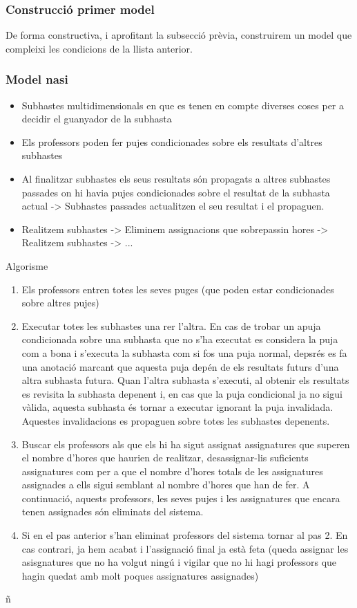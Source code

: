 \documentclass[10pt,twocolumn]{article}
\begin{document}
\subsubsection{Construcció primer model}
De forma constructiva, i aprofitant la subsecció prèvia, construirem un model que compleixi les condicions  de la llista anterior.

\subsubsection{Model nasi}
\begin{itemize}
	\item Subhastes multidimensionals en que es tenen en compte diverses coses per a decidir el guanyador de la subhasta
	\item Els professors poden fer pujes condicionades sobre els resultats d'altres subhastes
	\item Al finalitzar subhastes els seus resultats són propagats a altres subhastes passades on hi havia pujes condicionades sobre el resultat de la subhasta actual -> Subhastes passades actualitzen el seu resultat i el propaguen.
	\item Realitzem subhastes -> Eliminem assignacions que sobrepassin hores -> Realitzem subhastes -> ...
\end{itemize}

Algorisme
\begin{enumerate}
	\item Els professors entren totes les seves puges (que poden estar condicionades sobre altres pujes)
	\item Executar totes les subhastes una rer l'altra. En cas de trobar un apuja condicionada sobre una subhasta que no s'ha executat es considera la puja com a bona i s'executa la subhasta com si fos una puja normal, depsrés es fa una anotació marcant que aquesta puja depén de els resultats futurs d'una altra subhasta futura. Quan l'altra subhasta s'executi, al obtenir els resultats es revisita la subhasta depenent i, en cas que la puja condicional ja no sigui vàlida, aquesta subhasta és tornar a executar ignorant la puja invalidada. Aquestes invalidacions es propaguen sobre totes les subhastes depenents.
	\item Buscar els professors als que els hi ha sigut assignat assignatures que superen el nombre d'hores que haurien de realitzar, desassignar-lis suficients assignatures com per a que el nombre d'hores totals de les assignatures assignades a ells sigui semblant al nombre d'hores que han de fer. A continuació, aquests professors, les seves pujes i les assignatures que encara tenen assignades són eliminats del sistema.
	\item Si en el pas anterior s'han eliminat professors del sistema tornar al pas 2. En cas contrari, ja hem acabat i l'assignació final ja està feta (queda assignar les asisgnatures que no ha volgut ningú i vigilar que no hi hagi professors que hagin quedat amb molt poques assignatures assignades)
\end{enumerate}
ñ
\\
\newpage
\end{document}
